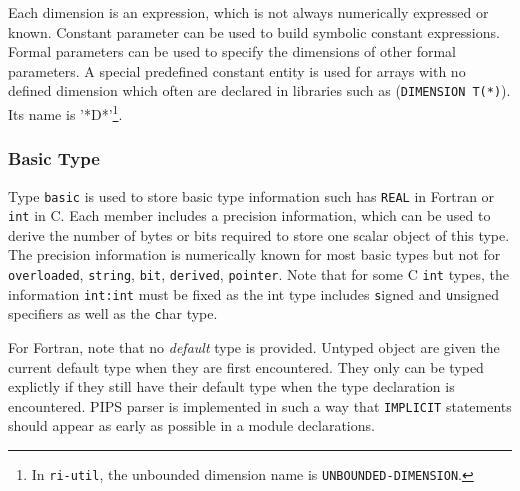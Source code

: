 \documentclass[a4paper]{article}
\begin{document}
\begin{comment}
Le domaine \verb/variable/ repr�sente le type d'une variable.  Le
sous-domaine \verb/basic/ donne le type Fortran de la variable.  Le
sous-domaine \verb/dimensions/ donne la liste des dimensions de la variable.
Un scalaire est un tableau de z�ro dimension.
\end{comment}

Each dimension is an expression, which is not always numerically
expressed or known. Constant parameter can be used to build symbolic
constant expressions. Formal parameters can be used to specify the
dimensions of other formal parameters. A special predefined constant
entity is used for arrays with no defined dimension which often are
declared in libraries such as (\verb/DIMENSION T(*)/). Its name is
'*D*'\footnote{In \texttt{ri-util}, the unbounded dimension name is 
\texttt{UNBOUNDED-DIMENSION}.}.

\begin{comment}
Chaque dimension est une expression, qui n'est pas n�cessairement
constante dans le cas des tableaux formels. La constante pr�d�finie de
nom '*D*' est utilis�e pour les tableaux de taille non d�finie
(\verb/DIMENSION T(*)/).
\end{comment}

\subsubsection{Basic Type}
\label{subsubsection-basic}


Type \texttt{basic} is used to store basic type information such has
\texttt{REAL} in Fortran or \texttt{int} in C. Each member includes a
precision information, which can be used to derive the number of bytes
or bits required to store one scalar object of this type. The
precision information is numerically known for most basic types but
not for \texttt{overloaded}, \texttt{string}, \texttt{bit},
\texttt{derived}, \texttt{pointer}. Note that for some C \texttt{int}
types, the information \texttt{int:int} must be fixed as the int type
includes {\texttt signed} and {\texttt unsigned} specifiers as well as
the {\texttt char} type.

For Fortran, note that no \emph{default} type is provided. Untyped
object are given the current default type when they are first
encountered. They only can be typed explictly if they still have their
default type when the type declaration is encountered. PIPS parser is
implemented in such a way that \texttt{IMPLICIT} statements should
appear as early as possible in a module declarations.
\end{document}
